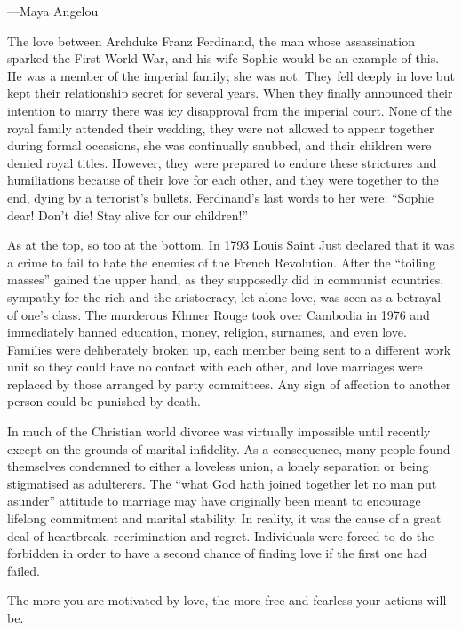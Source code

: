 \documentclass[10pt, openright]{book}
\newenvironment{epigram-2}%
{%
\vspace{1em}
\noindent
\quoting[leftmargin=2.5cm,rightmargin=2.5cm]%
\begin{itshape}
\large
}%
{\end{itshape}\endquoting
}%
\newenvironment{epigram-2-cite}%
{%
\quoting[leftmargin=2.5cm,rightmargin=2.5cm]%
\noindent\normal\hspace*{\fill} 
}%
{\endquoting\vspace{1em}
}%
\begin{document}
\begin{epigram-2-cite}
—Maya Angelou
\end{epigram-2-cite}

The love between Archduke Franz Ferdinand, the man whose assassination sparked the First World War, and his wife Sophie would be an example of this. He was a member of the imperial family; she was not. They fell deeply in love but kept their relationship secret for several years. When they finally announced their intention to marry there was icy disapproval from the imperial court. None of the royal family attended their wedding, they were not allowed to appear together during formal occasions, she was continually snubbed, and their children were denied royal titles. However, they were prepared to endure these strictures and humiliations because of their love for each other, and they were together to the end, dying by a terrorist’s bullets. Ferdinand’s last words to her were: “Sophie dear! Don’t die! Stay alive for our children!”


As at the top, so too at the bottom. In 1793 Louis Saint Just declared that it was a crime to fail to hate the enemies of the French Revolution. After the “toiling masses” gained the upper hand, as they supposedly did in communist countries, sympathy for the rich and the aristocracy, let alone love, was seen as a betrayal of one’s class. The murderous Khmer Rouge took over Cambodia in 1976 and immediately banned education, money, religion, surnames, and even love. Families were deliberately broken up, each member being sent to a different work unit so they could have no contact with each other, and love marriages were replaced by those arranged by party committees. Any sign of affection to another person could be punished by death.


In much of the Christian world divorce was virtually impossible until recently except on the grounds of marital infidelity. As a consequence, many people found themselves condemned to either a loveless union, a lonely separation or being stigmatised as adulterers. The “what God hath joined together let no man put asunder” attitude to marriage may have originally been meant to encourage lifelong commitment and marital stability. In reality, it was the cause of a great deal of heartbreak, recrimination and regret. Individuals were forced to do the forbidden in order to have a second chance of finding love if the first one had failed.


\begin{epigram-2}
The more you are motivated by love, the more free and fearless your actions will be.
\end{epigram-2}
\end{document}
